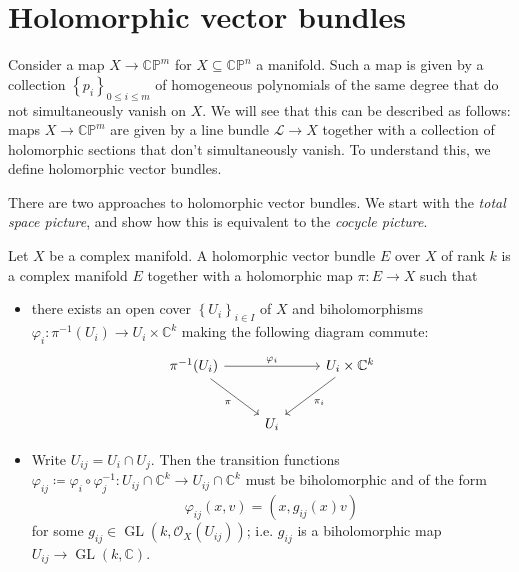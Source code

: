 \section{Holomorphic vector bundles}


Consider a map $X\to \mathbb{C} \mathbb{P}^m$ for $X\subseteq \mathbb{C} \mathbb{P} ^n$ a manifold. Such a map is given by a collection $\left\{ p_i \right\} _{0\leq i\leq m} $ of homogeneous polynomials of the same degree that do not simultaneously vanish on $X$. We will see that this can be described as follows: maps $X\to \mathbb{C}\mathbb{P} ^m$ are given by a line bundle $\mathcal{L} \to X$ together with a collection of holomorphic sections that don't simultaneously vanish. To understand this, we define holomorphic vector bundles.

There are two approaches to holomorphic vector bundles. We start with the \emph{total space picture}, and show how this is equivalent to the \emph{cocycle picture}.

\begin{definition}\label{>>>}
	Let $X$ be a complex manifold. A holomorphic vector bundle $E$ over $X$ of rank $ k$ is a complex manifold $E$ together with a holomorphic map $\pi : E \to X$ such that
	\begin{itemize}
		\item there exists an open cover $\left\{ U_i \right\} _{i\in I} $ of $X$ and biholomorphisms $\varphi _i : \pi ^{-1} (U_i) \to U_i\times \mathbb{C} ^k$ making the following diagram commute:
			\[\begin{tikzcd}[row sep = 2.5em, column sep = 2.5em]
			\pi ^{-1} (U_i)\ar[" \varphi _i ", rr] \ar[" \pi  "', dr]  &  & U_i\times \mathbb{C} ^k \ar[" \pi _i ", dl]  \\
			 & U_i & 
			\end{tikzcd}\]
		\item Write $U_{ij} =U_i \cap U_j$. Then the transition functions $\varphi _{ij} \coloneqq \varphi _i \circ \varphi _j^{-1} : U_{ij} \cap \mathbb{C} ^k \to U_{ij} \cap \mathbb{C} ^k$ must be biholomorphic and of the form
			\[
				\varphi _{ij} (x,v)=(x,g_{ij} (x)v)
			\]
			for some $g_{ij} \in \operatorname{GL} (k,\mathcal{O}_X(U_{ij} ))$; i.e. $g_{ij} $ is a biholomorphic map $U_{ij} \to \operatorname{GL} (k,\mathbb{C} )$.
	\end{itemize}
\end{definition}

